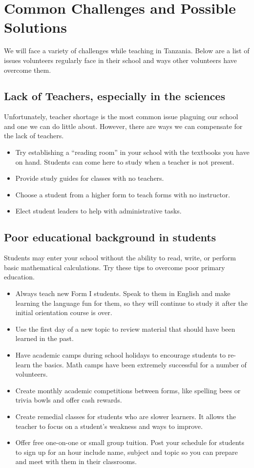 \chapter{Common Challenges and Possible Solutions}
We will face a variety of challenges while teaching in Tanzania.  Below are a list of issues volunteers regularly face in their school and ways other volunteers have overcome them. 

\section{Lack of Teachers, especially in the sciences}
Unfortunately, teacher shortage is the most common issue plaguing our school and one we can do little about.  However, there are ways we can compensate for the lack of teachers.

\begin{itemize} 
 \item Try establishing a ``reading room'' in your school with the textbooks you have on hand.  Students can come here to study when a teacher is not present. 
 \item Provide study guides for classes with no teachers.
 \item Choose a student from a higher form to teach forms with no instructor.
 \item Elect student leaders to help with administrative tasks.
\end{itemize}

\section{Poor educational background in students}
Students may enter your school without the ability to read, write, or perform basic mathematical calculations.  Try these tips to overcome poor primary education.

\begin{itemize}
 \item Always teach new Form I students.  Speak to them in English and make learning the language fun for them, so they will continue to study it after the initial orientation course is over. \
 \item Use the first day of a new topic to review material that should have been learned in the past. 
 \item Have academic camps during school holidays to encourage students to re-learn the basics. Math camps have been extremely successful for a number of volunteers.
 \item Create monthly academic competitions between forms, like spelling bees or trivia bowls and offer cash rewards.
 \item Create remedial classes for students who are slower learners.  It allows the teacher to focus on a student's weakness and ways to improve.
 \item Offer free one-on-one or small group tuition. Post your schedule for students to sign up for an hour include name, subject and topic so you can prepare and meet with them in their classrooms.
\end{itemize}

